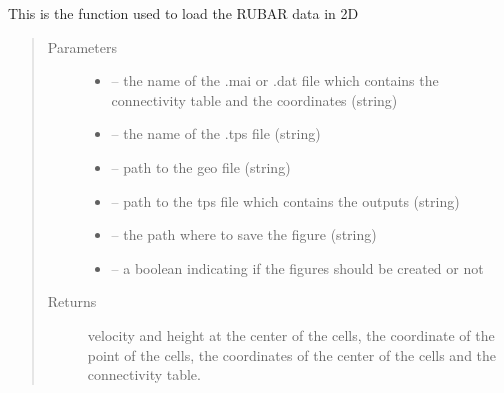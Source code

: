 \documentclass[letterpaper,10pt,english]{sphinxmanual}
\begin{document}
\begin{fulllineitems}
\label{\detokenize{index:src.rubar.load_rubar2d}}
This is the function used to load the RUBAR data in 2D
\begin{quote}\begin{description}
\item[{Parameters}] \leavevmode\begin{itemize}
\item {} 
 -- the name of the .mai or .dat file which contains the connectivity table and the coordinates (string)

\item {} 
 -- the name of the .tps file (string)

\item {} 
 -- path to the geo file (string)

\item {} 
 -- path to the tps file which contains the outputs (string)

\item {} 
 -- the path where to save the figure (string)

\item {} 
 -- a boolean indicating if the figures should be created or not

\end{itemize}

\item[{Returns}] \leavevmode
velocity and height at the center of the cells, the coordinate of the point of the cells,
the coordinates of the center of the cells and the connectivity table.

\end{description}\end{quote}

\end{fulllineitems}

\end{document}
